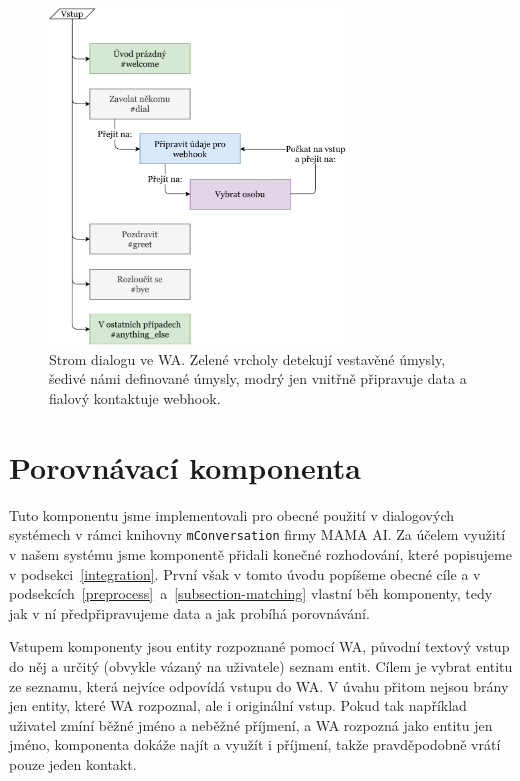 \begin{figure}[h]
    \centering
    \includegraphics[width=0.7\textwidth]{../img/wa-tree.pdf}
    \caption{Strom dialogu ve WA. Zelené vrcholy detekují vestavěné úmysly,
        šedivé námi definované úmysly, modrý jen vnitřně připravuje data a fialový
        kontaktuje webhook.}
    \label{img-wa-tree}
\end{figure}

\section{Porovnávací komponenta}\label{matching}

Tuto komponentu jsme implementovali pro obecné použití v dialogových systémech
v rámci knihovny \texttt{mConversation} firmy MAMA AI. Za účelem využití v našem
systému jsme komponentě přidali konečné rozhodování, které popisujeme v podsekci~\ref{integration}.
První však v tomto úvodu popíšeme obecné cíle a v podsekcích~\ref{preprocess}~a~\ref{subsection-matching}
vlastní běh komponenty, tedy jak v ní předpřipravujeme data a jak probíhá porovnávání.

Vstupem komponenty jsou entity rozpoznané pomocí WA, původní textový vstup do něj
a určitý (obvykle vázaný na uživatele) seznam entit. Cílem je vybrat entitu ze seznamu,
která nejvíce odpovídá vstupu do WA. V úvahu přitom nejsou brány jen entity, které
WA rozpoznal, ale i originální vstup. Pokud tak například uživatel zmíní běžné jméno a
neběžné příjmení, a WA rozpozná jako entitu jen jméno, komponenta dokáže najít a využít
i příjmení, takže pravděpodobně vrátí pouze jeden kontakt.

